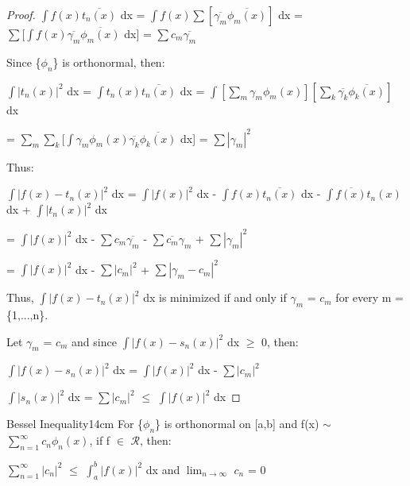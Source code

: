     \begin{proof}
        $\int f(x) \overline{t_n(x)}$ dx
        = $\int f(x) \sum [\overline{\gamma_m} \overline{\phi_m(x)}]$ dx
        = $\sum [\int f(x) \overline{\gamma_m} \overline{\phi_m(x)}$ dx]
        = $\sum c_m \overline{\gamma_m}$

        Since \{$\phi_n$\} is orthonormal, then:

        \hspace{0.5cm}
        $\int |t_n(x)|^2$ dx 
        = $\int t_n(x) \overline{t_n(x)}$ dx
        = $\int [\sum_m \gamma_m\phi_m(x)]
                [\sum_k \overline{\gamma_k}\overline{\phi_k(x)}]$ dx
        
        \hspace{2.9cm}
        = $\sum_m \sum_k [\int \gamma_m\phi_m(x)
                \overline{\gamma_k}\overline{\phi_k(x)}$ dx]
        = $\sum |\gamma_m|^2$

        Thus:

        \hspace{0.1cm}
        $\int |f(x) - t_n(x)|^2$ dx
        = $\int |f(x)|^2$ dx - $\int f(x) \overline{t_n(x)}$ dx
            - $\int \overline{f(x)} t_n(x)$ dx + $\int |t_n(x)|^2$ dx
        
        \hspace{3.7cm}
        = $\int |f(x)|^2$ dx - $\sum c_m \overline{\gamma_m}$
        - $\sum \overline{c_m} \gamma_m$ + $\sum |\gamma_m|^2$

        \hspace{3.7cm}
        = $\int |f(x)|^2$ dx - $\sum |c_m|^2$ + $\sum |\gamma_m - c_m|^2$

        Thus, $\int |f(x) - t_n(x)|^2$ dx
        is minimized if and only if $\gamma_m$ = $c_m$ for every m = \{1,...,n\}.

        Let $\gamma_m$ = $c_m$ and since $\int |f(x) - s_n(x)|^2$ dx $\geq$ 0, then:

        \hspace{0.5cm}
        $\int |f(x) - s_n(x)|^2$ dx = $\int |f(x)|^2$ dx - $\sum |c_m|^2$

        \hspace{0.5cm}
        $\int |s_n(x)|^2$ dx
        = $\sum |c_m|^2$
        $\leq$ $\int |f(x)|^2$ dx
    \end{proof}

    \vspace{0.5cm}



    \begin{wtheorem}{Bessel Inequality}{14cm}
        For \{$\phi_n$\} is orthonormal on [a,b] and
        f(x) $\sim$ $\sum_{n=1}^{\infty} c_n\phi_n(x)$,
        if f $\in$ $\mathscr{R}$, then:

        \hspace{0.5cm}
        $\sum_{n=1}^{\infty} |c_n|^2$ $\leq$ $\int_a^b |f(x)|^2$ dx
        \hspace{1cm}
        and
        \hspace{1cm}
        $\lim_{n \rightarrow \infty}$ $c_n$ = 0
    \end{wtheorem}

